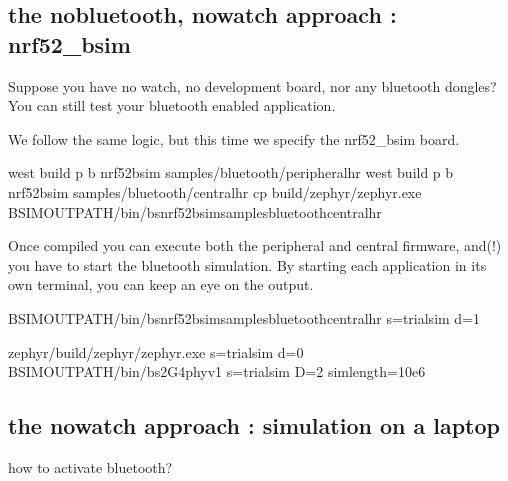 \documentclass[letterpaper,10pt,english]{sphinxmanual}
\begin{document}
\subsection{the no\sphinxhyphen{}bluetooth, no\sphinxhyphen{}watch approach : nrf52\_bsim}
\label{\detokenize{bluetooth:the-no-bluetooth-no-watch-approach-nrf52-bsim}}
Suppose you have no watch, no development board, nor any bluetooth dongles?
You can still test your bluetooth enabled application.

We follow the same logic, but this time we specify the nrf52\_bsim board.

\begin{sphinxVerbatim}[commandchars=\\\{\}]
west build \PYGZhy{}p \PYGZhy{}b nrf52\PYGZus{}bsim samples/bluetooth/peripheral\PYGZus{}hr
west build \PYGZhy{}p \PYGZhy{}b nrf52\PYGZus{}bsim samples/bluetooth/central\PYGZus{}hr
cp build/zephyr/zephyr.exe  \PYGZdl{}\PYGZob{}BSIM\PYGZus{}OUT\PYGZus{}PATH\PYGZcb{}/bin/bs\PYGZus{}nrf52\PYGZus{}bsim\PYGZus{}samples\PYGZus{}bluetooth\PYGZus{}central\PYGZus{}hr
\end{sphinxVerbatim}

Once compiled you can execute both the peripheral and central firmware, and(!) you have to start the bluetooth simulation.
By starting each application in its own terminal, you can keep an eye on the output.

\begin{sphinxVerbatim}[commandchars=\\\{\}]
\PYGZdl{}\PYGZob{}BSIM\PYGZus{}OUT\PYGZus{}PATH\PYGZcb{}/bin/bs\PYGZus{}nrf52\PYGZus{}bsim\PYGZus{}samples\PYGZus{}bluetooth\PYGZus{}central\PYGZus{}hr \PYGZhy{}s=trial\PYGZus{}sim \PYGZhy{}d=1

 zephyr/build/zephyr/zephyr.exe \PYGZhy{}s=trial\PYGZus{}sim \PYGZhy{}d=0
 \PYGZdl{}\PYGZob{}BSIM\PYGZus{}OUT\PYGZus{}PATH\PYGZcb{}/bin/bs\PYGZus{}2G4\PYGZus{}phy\PYGZus{}v1 \PYGZhy{}s=trial\PYGZus{}sim \PYGZhy{}D=2 \PYGZhy{}sim\PYGZus{}length=10e6
\end{sphinxVerbatim}


\subsection{the no\sphinxhyphen{}watch approach : simulation on a laptop}
\label{\detokenize{bluetooth:the-no-watch-approach-simulation-on-a-laptop}}
how to activate bluetooth?
\end{document}
